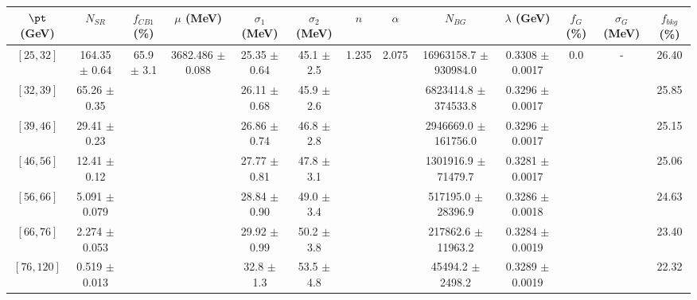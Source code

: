 \begin{tabular}{c||c|c|c|c|c|c|c|c|c|c|c||c}
$\pt$ (GeV) & $N_{SR}$ & $f_{CB1}$ (\%) & $\mu$ (MeV) & $\sigma_1$ (MeV) & $\sigma_2$ (MeV) & $n$ & $\alpha$ & $N_{BG}$ & $\lambda$ (GeV) & $f_G$ (\%) & $\sigma_G$ (MeV) & $f_{bkg}$ (\%) \\
\hline
$[25, 32]$ & 164.35 $\pm$ 0.64 & \multirow{7}{*}{65.9 $\pm$ 3.1} & \multirow{7}{*}{3682.486 $\pm$ 0.088} & 25.35 $\pm$ 0.64 & 45.1 $\pm$ 2.5 & \multirow{7}{*}{1.235} & \multirow{7}{*}{2.075} & 16963158.7 $\pm$ 930984.0 & 0.3308 $\pm$ 0.0017 & \multirow{7}{*}{0.0} & \multirow{7}{*}{-} & 26.40\\
$[32, 39]$ & 65.26 $\pm$ 0.35 &  &  & 26.11 $\pm$ 0.68 & 45.9 $\pm$ 2.6 &  &  & 6823414.8 $\pm$ 374533.8 & 0.3296 $\pm$ 0.0017 &  &  & 25.85\\
$[39, 46]$ & 29.41 $\pm$ 0.23 &  &  & 26.86 $\pm$ 0.74 & 46.8 $\pm$ 2.8 &  &  & 2946669.0 $\pm$ 161756.0 & 0.3296 $\pm$ 0.0017 &  &  & 25.15\\
$[46, 56]$ & 12.41 $\pm$ 0.12 &  &  & 27.77 $\pm$ 0.81 & 47.8 $\pm$ 3.1 &  &  & 1301916.9 $\pm$ 71479.7 & 0.3281 $\pm$ 0.0017 &  &  & 25.06\\
$[56, 66]$ & 5.091 $\pm$ 0.079 &  &  & 28.84 $\pm$ 0.90 & 49.0 $\pm$ 3.4 &  &  & 517195.0 $\pm$ 28396.9 & 0.3286 $\pm$ 0.0018 &  &  & 24.63\\
$[66, 76]$ & 2.274 $\pm$ 0.053 &  &  & 29.92 $\pm$ 0.99 & 50.2 $\pm$ 3.8 &  &  & 217862.6 $\pm$ 11963.2 & 0.3284 $\pm$ 0.0019 &  &  & 23.40\\
$[76, 120]$ & 0.519 $\pm$ 0.013 &  &  & 32.8 $\pm$ 1.3 & 53.5 $\pm$ 4.8 &  &  & 45494.2 $\pm$ 2498.2 & 0.3289 $\pm$ 0.0019 &  &  & 22.32\\
\end{tabular}
